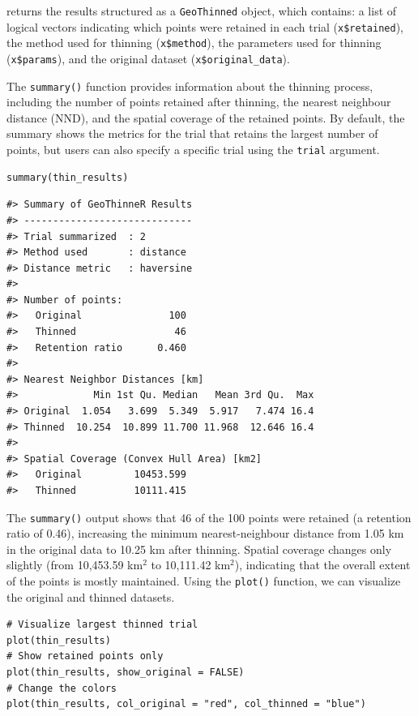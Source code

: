  returns the results structured as a \texttt{GeoThinned} object, which contains: a list of logical vectors indicating which points were retained in each trial (\texttt{x\$retained}), the method used for thinning (\texttt{x\$method}), the parameters used for thinning (\texttt{x\$params}), and the original dataset (\texttt{x\$original\_data}).

The \texttt{summary()} function provides information about the thinning process, including the number of points retained after thinning, the nearest neighbour distance (NND), and the spatial coverage of the retained points. By default, the summary shows the metrics for the trial that retains the largest number of points, but users can also specify a specific trial using the \texttt{trial} argument.

\begin{verbatim}
summary(thin_results)
\end{verbatim}

\begin{verbatim}
#> Summary of GeoThinneR Results
#> -----------------------------
#> Trial summarized  : 2 
#> Method used       : distance 
#> Distance metric   : haversine 
#> 
#> Number of points:
#>   Original               100
#>   Thinned                 46
#>   Retention ratio      0.460
#> 
#> Nearest Neighbor Distances [km]
#>             Min 1st Qu. Median   Mean 3rd Qu.  Max
#> Original  1.054   3.699  5.349  5.917   7.474 16.4
#> Thinned  10.254  10.899 11.700 11.968  12.646 16.4
#> 
#> Spatial Coverage (Convex Hull Area) [km2]
#>   Original         10453.599
#>   Thinned          10111.415
\end{verbatim}

The \texttt{summary()} output shows that 46 of the 100 points were retained (a retention ratio of 0.46), increasing the minimum nearest-neighbour distance from 1.05 km in the original data to 10.25 km after thinning. Spatial coverage changes only slightly (from 10,453.59 km\(^2\) to 10,111.42 km\(^2\)), indicating that the overall extent of the points is mostly maintained. Using the \texttt{plot()} function, we can visualize the original and thinned datasets.

\begin{verbatim}
# Visualize largest thinned trial
plot(thin_results)
# Show retained points only
plot(thin_results, show_original = FALSE)
# Change the colors
plot(thin_results, col_original = "red", col_thinned = "blue")
\end{verbatim}

